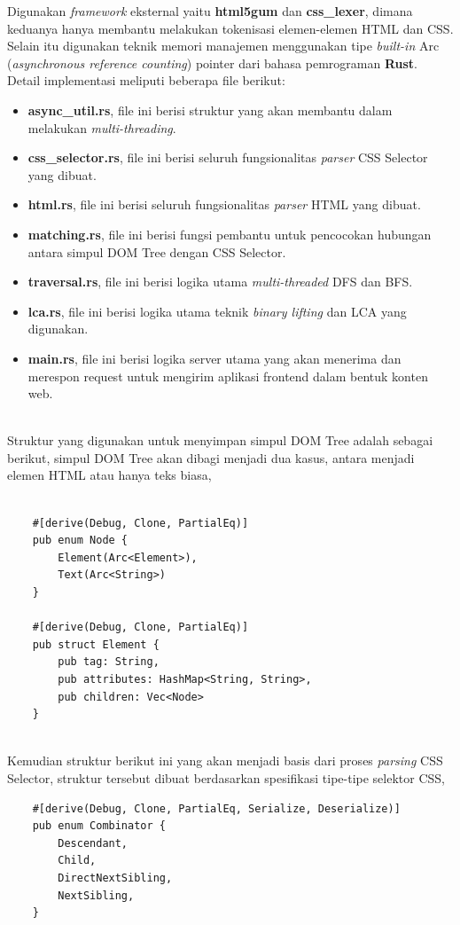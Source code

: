 \documentclass[12pt,a4paper]{article}
\begin{document}
\begin{itemize}
Digunakan \textit{framework} eksternal yaitu \textbf{html5gum} dan \textbf{css\_lexer}, 
dimana keduanya hanya membantu melakukan tokenisasi elemen-elemen HTML dan CSS. 
Selain itu digunakan teknik memori manajemen menggunakan tipe \textit{built-in} Arc (\textit{asynchronous reference counting}) pointer dari bahasa pemrograman \textbf{Rust}. \\

Detail implementasi meliputi beberapa file berikut:
\begin{itemize}
    \item \textbf{async\_util.rs}, file ini berisi struktur yang akan membantu dalam melakukan \textit{multi-threading}.
    \item \textbf{css\_selector.rs}, file ini berisi seluruh fungsionalitas \textit{parser} CSS Selector yang dibuat.
    \item \textbf{html.rs}, file ini berisi seluruh fungsionalitas \textit{parser} HTML yang dibuat.
    \item \textbf{matching.rs}, file ini berisi fungsi pembantu untuk pencocokan hubungan antara simpul DOM Tree dengan CSS Selector.
    \item \textbf{traversal.rs}, file ini berisi logika utama \textit{multi-threaded} DFS dan BFS.
    \item \textbf{lca.rs}, file ini berisi logika utama teknik \textit{binary lifting} dan LCA yang digunakan.
    \item \textbf{main.rs}, file ini berisi logika server utama yang akan menerima dan merespon request untuk mengirim aplikasi frontend dalam bentuk konten web.
\end{itemize} \\


Struktur yang digunakan untuk menyimpan simpul DOM Tree adalah sebagai berikut, simpul DOM Tree akan dibagi menjadi dua kasus, antara menjadi elemen HTML atau hanya teks biasa,
\begin{verbatim}

    #[derive(Debug, Clone, PartialEq)]
    pub enum Node {
        Element(Arc<Element>),
        Text(Arc<String>)
    }

    #[derive(Debug, Clone, PartialEq)]
    pub struct Element {
        pub tag: String,
        pub attributes: HashMap<String, String>,
        pub children: Vec<Node>
    }
\end{verbatim} \\


Kemudian struktur berikut ini yang akan menjadi basis dari proses \textit{parsing} CSS Selector, struktur tersebut dibuat berdasarkan spesifikasi tipe-tipe selektor CSS,
\begin{verbatim}
    #[derive(Debug, Clone, PartialEq, Serialize, Deserialize)]
    pub enum Combinator {
        Descendant,
        Child,
        DirectNextSibling,
        NextSibling,
    }
    

\end{verbatim}
\end{itemize}
\end{document}
